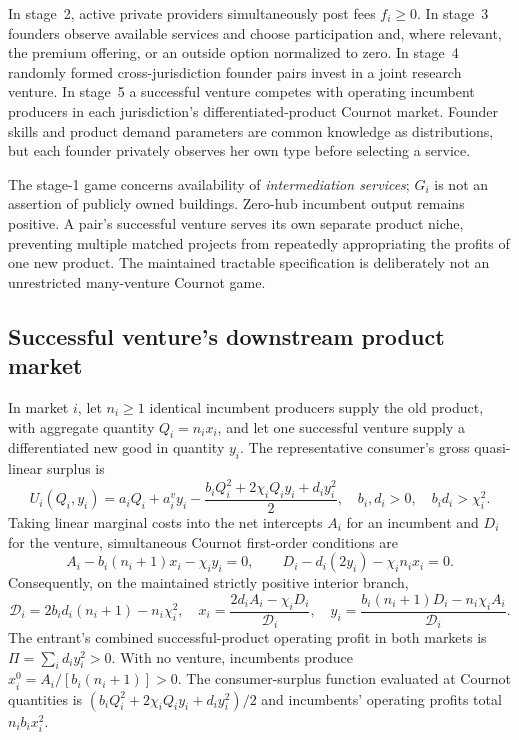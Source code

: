 \documentclass[11pt]{article}
\begin{document}
In stage~2, active private providers simultaneously post fees $f_i\geq0$. In stage~3 founders observe available services and choose participation and, where relevant, the premium offering, or an outside option normalized to zero. In stage~4 randomly formed cross-jurisdiction founder pairs invest in a joint research venture. In stage~5 a successful venture competes with operating incumbent producers in each jurisdiction's differentiated-product Cournot market. Founder skills and product demand parameters are common knowledge as distributions, but each founder privately observes her own type before selecting a service.

The stage-1 game concerns availability of \emph{intermediation services}; $G_i$ is not an assertion of publicly owned buildings. Zero-hub incumbent output remains positive. A pair's successful venture serves its own separate product niche, preventing multiple matched projects from repeatedly appropriating the profits of one new product. The maintained tractable specification is deliberately not an unrestricted many-venture Cournot game.

\subsection{Successful venture's downstream product market}
In market $i$, let $n_i\geq1$ identical incumbent producers supply the old product, with aggregate quantity $Q_i=n_i x_i$, and let one successful venture supply a differentiated new good in quantity $y_i$. The representative consumer's gross quasi-linear surplus is
\begin{equation}
 U_i(Q_i,y_i)=a_iQ_i+a_i^v y_i-
 \frac{b_iQ_i^2+2\chi_iQ_iy_i+d_iy_i^2}{2},
 \quad b_i,d_i>0,\quad b_id_i>\chi_i^2.
 \label{eq:utility}
\end{equation}
Taking linear marginal costs into the net intercepts $A_i$ for an incumbent and $D_i$ for the venture, simultaneous Cournot first-order conditions are
\begin{equation}
 A_i-b_i(n_i+1)x_i-\chi_i y_i=0,\qquad
 D_i-d_i(2y_i)-\chi_i n_i x_i=0.
 \label{eq:cournot-foc}
\end{equation}
Consequently, on the maintained strictly positive interior branch,
\begin{equation}
 \mathcal D_i=2b_id_i(n_i+1)-n_i\chi_i^2,\quad
 x_i=\frac{2d_iA_i-\chi_iD_i}{\mathcal D_i},\quad
 y_i=\frac{b_i(n_i+1)D_i-n_i\chi_iA_i}{\mathcal D_i}.
 \label{eq:cournot}
\end{equation}
The entrant's combined successful-product operating profit in both markets is $\Pi=\sum_i d_i y_i^2>0$. With no venture, incumbents produce $x_i^0=A_i/[b_i(n_i+1)]>0$. The consumer-surplus function evaluated at Cournot quantities is $(b_i Q_i^2+2\chi_iQ_iy_i+d_iy_i^2)/2$ and incumbents' operating profits total $n_i b_i x_i^2$.
\end{document}
